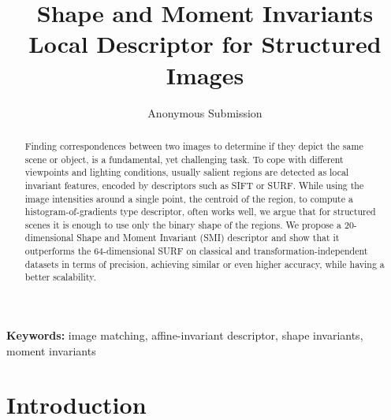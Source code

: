 \documentclass[a4paper,11pt]{article}
\begin{document}
\title{Shape and Moment Invariants Local Descriptor for Structured Images}

\author{Anonymous Submission}

\date{}
\maketitle
\thispagestyle{empty}



\begin{abstract}
Finding correspondences between two images to determine if they depict the same scene or object, is a fundamental, yet challenging task. To cope with different viewpoints and lighting conditions, usually salient regions are detected as local invariant features, encoded by descriptors such as SIFT or SURF. While using the image intensities around a single point, the centroid of the region, to compute a histogram-of-gradients type descriptor, often works well, we argue that for structured scenes it is enough to use only the binary shape of the regions. We propose a $20$-dimensional Shape and Moment Invariant (SMI) descriptor and show that it outperforms the $64$-dimensional SURF on classical and transformation-independent datasets in terms of precision, achieving similar or even higher accuracy, while having a better scalability.
\end{abstract}
\textbf{Keywords:} image matching, affine-invariant descriptor, shape invariants, moment invariants



\section{Introduction}
\end{document}
